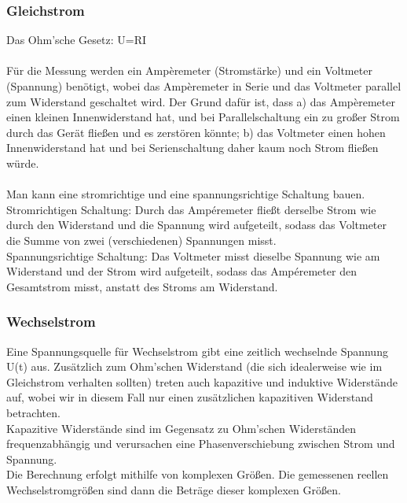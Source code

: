 \documentclass{article}
\begin{document}
\subsubsection*{Gleichstrom}
Das Ohm'sche Gesetz: U=RI\\
\\
Für die Messung werden ein Ampèremeter (Stromstärke) und ein Voltmeter (Spannung) benötigt, wobei das Ampèremeter in Serie und das Voltmeter parallel zum Widerstand geschaltet wird. Der Grund dafür ist, dass a) das Ampèremeter einen kleinen Innenwiderstand hat, und bei Parallelschaltung ein zu großer Strom durch das Gerät fließen und es zerstören könnte; b) das Voltmeter einen hohen Innenwiderstand hat und bei Serienschaltung daher kaum noch Strom fließen würde.\\
\\
Man kann eine stromrichtige und eine spannungsrichtige Schaltung bauen. \\
Stromrichtigen Schaltung: Durch das Ampéremeter fließt derselbe Strom wie durch den Widerstand und die Spannung wird aufgeteilt, sodass das Voltmeter die Summe von zwei (verschiedenen) Spannungen misst.\\
Spannungsrichtige Schaltung: Das Voltmeter misst dieselbe Spannung wie am Widerstand und der Strom wird aufgeteilt, sodass das Ampéremeter den Gesamtstrom misst, anstatt des Stroms am Widerstand.

\subsubsection*{Wechselstrom}
Eine Spannungsquelle für Wechselstrom gibt eine zeitlich wechselnde Spannung U(t) aus. Zusätzlich zum Ohm'schen Widerstand (die sich idealerweise wie im Gleichstrom verhalten sollten) treten auch kapazitive und induktive Widerstände auf, wobei wir in diesem Fall nur einen zusätzlichen kapazitiven Widerstand betrachten.\\
Kapazitive Widerstände sind im Gegensatz zu Ohm'schen Widerständen frequenzabhängig und verursachen eine Phasenverschiebung zwischen Strom und Spannung. \\
Die Berechnung erfolgt mithilfe von komplexen Größen. Die gemessenen reellen Wechselstromgrößen sind dann die Beträge dieser komplexen Größen.
\end{document}
